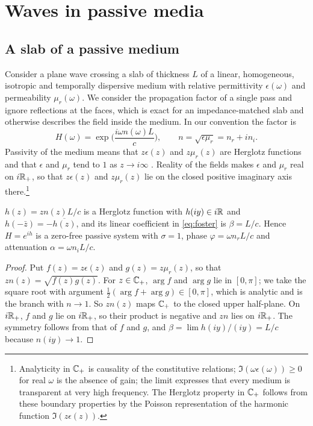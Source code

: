 \section{Waves in passive media}\label{sec:waves}

\subsection{A slab of a passive medium}

Consider a plane wave crossing a slab of thickness $L$ of a linear,
homogeneous, isotropic and temporally dispersive medium with relative
permittivity $\epsilon(\omega)$ and permeability $\mu_r(\omega)$. We
consider the propagation factor of a single pass and ignore reflections at
the faces, which is exact for an impedance-matched slab and otherwise
describes the field inside the medium. In our convention the factor is
\[
H(\omega)=\exp\Big(\frac{i\omega n(\omega)L}c\Big),\qquad
n=\sqrt{\epsilon\mu_r}=n_r+in_i .
\]
Passivity of the medium means that $z\epsilon(z)$ and $z\mu_r(z)$ are
Herglotz functions and that $\epsilon$ and $\mu_r$ tend to $1$ as
$z\to i\infty$ \cite{nussenzveig,gustafsson,bernland}. Reality of the fields
makes $\epsilon$ and $\mu_r$ real on $i\mathbb R_+$, so that $z\epsilon(z)$ and
$z\mu_r(z)$ lie on the closed positive imaginary axis there.\footnote{Analyticity in $\mathbb C_{+}$ is
causality of the constitutive relations; $\Im(\omega\epsilon(\omega))\ge0$ for
real $\omega$ is the absence of gain; the limit expresses that every medium is
transparent at very high frequency. The Herglotz property in $\mathbb C_{+}$ follows from
these boundary properties by the Poisson representation of the harmonic
function $\Im(z\epsilon(z))$.}

\begin{lemma}\label{lem:index}
$h(z)=zn(z)L/c$ is a Herglotz function with $h(iy)\in i\mathbb R$ and
$h(-\bar z)=-\overline{h(z)}$, and its linear coefficient in
\eqref{eq:foster} is $\beta=L/c$. Hence $H=e^{ih}$ is a zero-free passive
system with $\sigma=1$, phase $\varphi=\omega n_rL/c$ and attenuation
$\alpha=\omega n_iL/c$.
\end{lemma}

\begin{proof}
Put $f(z)=z\epsilon(z)$ and $g(z)=z\mu_r(z)$, so that $zn(z)=\sqrt{f(z)g(z)}$.
For $z\in\mathbb C_{+}$, $\arg f$ and $\arg g$ lie in $[0,\pi]$; we take the square
root with argument $\frac12(\arg f+\arg g)\in[0,\pi]$, which is analytic and
is the branch with $n\to1$. So $zn(z)$ maps $\mathbb C_{+}$ to the closed upper
half-plane. On $i\mathbb R_+$, $f$ and $g$ lie on $i\mathbb R_+$, so their product is
negative and $zn$ lies on $i\mathbb R_+$. The symmetry follows from that of $f$ and
$g$, and $\beta=\lim h(iy)/(iy)=L/c$ because $n(iy)\to1$.
\end{proof}

